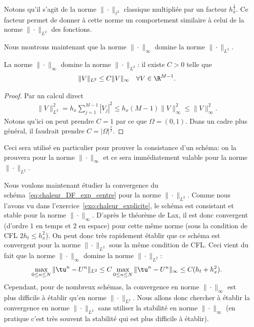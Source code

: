 \documentclass[12pt,a4paper,twoside]{article}
\begin{document}
\begin{remark}
  Notons qu'il s'agit de la norme $\| \cdot \|_{\ell^2}$ classique multipli\'ee par un
  facteur $h_x^{\frac12}$. Ce facteur permet de donner \`a cette norme un comportement similaire
  \`a celui de la norme $\| \cdot \|_{L^2}$ des fonctions.
\end{remark}

Nous montrons maintenant que la norme $\| \cdot \|_{\infty}$ domine la norme $\| \cdot \|_{L^2}$.

\begin{proposition}
  La norme $\| \cdot \|_{\infty}$ domine la norme $\| \cdot \|_{L^2}$:
  il existe $C > 0$ telle que
  \begin{align*}
    \| V \|_{L^2} \leq C \| V \|_{\infty}
    \quad \forall V \in \R^{M-1} .
  \end{align*}
\end{proposition}

\begin{proof}
  Par un calcul direct
  \begin{align*}
    \| V \|_{L^2}^2 = h_x \sum_{j=1}^{M-1} |V_j|^2
    \leq h_x (M-1) \| V \|_{\infty}^2 \leq \| V \|_{\infty}^2 .
  \end{align*}
  Notons qu'ici on peut prendre $C = 1$ par ce que $\Omega = (0,1)$.
  Dans un cadre plus g\'en\'eral, il faudrait prendre $C = | \Omega |^{\frac12}$.
\end{proof}

\begin{remark}
  Ceci sera utilis\'e en particulier pour prouver la consistance d'un sch\'ema:
  on la prouvera pour la norme $\| \cdot \|_{\infty}$ et ce sera imm\'ediatement valable
  pour la norme $\| \cdot \|_{L^2}$.
\end{remark}

Nous voulons maintenant \'etudier la convergence du sch\'ema~\eqref{eq:chaleur_DF_exp_centre}
pour la norme $\| \cdot \|_{L^2}$.
Comme nous l'avons vu dans l'exercice~\ref{exo:chaleur_explicite},
le sch\'ema est consistant et stable pour la norme $\| \cdot \|_{\infty}$.
D'apr\`es le th\'eor\`eme de Lax, il est donc convergent (d'ordre 1 en temps et 2 en espace)
pour cette m\^eme norme (sous la condition de CFL $2 h_t \leq h_x^2$).
On peut donc tr\`es rapidement \'etablir que ce sch\'ema est convergent pour la norme
$\| \cdot \|_{L^2}$ sous la m\^eme condition de CFL.
Ceci vient du fait que la norme $\| \cdot \|_{\infty}$ domine la norme $\| \cdot \|_{L^2}$:
\[
  \max_{0 \leq n \leq N} \| \tu^n - U^n \|_{L^2}
  \leq C \max_{0 \leq n \leq N} \| \tu^n - U^n \|_{\infty}
  \leq C (h_t + h_x^2) .
\]
Cependant, pour de nombreux sch\'emas, la convergence en norme $\| \cdot \|_{\infty}$
est plus difficile \`a \'etablir qu'en norme $\| \cdot \|_{L^2}$.
Nous allons donc chercher \`a \'etablir la convergence en norme $\| \cdot \|_{L^2}$
sans utiliser la stabilit\'e en norme $\| \cdot \|_{\infty}$ (en pratique c'est tr\`es souvent
la stabilit\'e qui est plus difficile \`a \'etablir).
\end{document}
